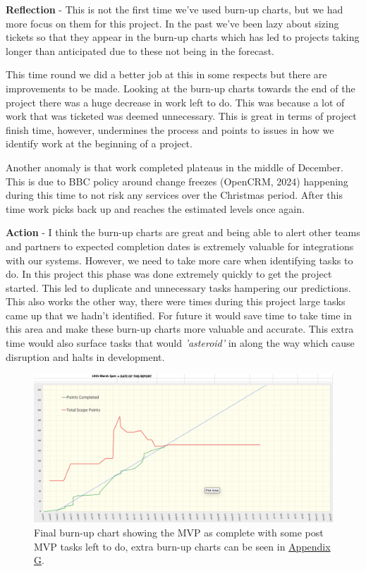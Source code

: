   \vspace{0.2cm}
  \textbf{Reflection} - This is not the first time we've used burn-up charts, but we had more focus on them for this project. In the past we've been 
  lazy about sizing tickets so that they appear in the burn-up charts which has led to projects taking longer than anticipated due to these not 
  being in the forecast.

  This time round we did a better job at this in some respects but there are improvements to be made. Looking at the burn-up charts towards the end of the 
  project there was a huge decrease in work left to do. This was because a lot of work that was ticketed was deemed unnecessary. This is great in terms of 
  project finish time, however, undermines the process and points to issues in how we identify work at the beginning of a project.

  Another anomaly is that work completed plateaus in the middle of December. This is due to BBC policy around change freezes (OpenCRM, 2024) happening 
  during this time to not risk any services over the Christmas period. After this time work picks back up and reaches the estimated levels once again.

  \vspace{0.2cm}
  \textbf{Action} - I think the burn-up charts are great and being able to alert other teams and partners to expected completion dates is extremely
  valuable for integrations with our systems. However, we need to take more care when identifying tasks to do. In this project this phase was done 
  extremely quickly to get the project started. This led to duplicate and unnecessary tasks hampering our predictions. This also works the other way, 
  there were times during this project large tasks came up that we hadn't identified. For future it would save time to take time in this area and make these 
  burn-up charts more valuable and accurate. This extra time would also surface tasks that would \textit{'asteroid'} in along the way which cause disruption 
  and halts in development.

  \begin{figure}[H]
    \centering
    \includegraphics[width=12cm]{assets/outputs/burnups/finalBurnUp.png}
    \caption{Final burn-up chart showing the MVP as complete with some post MVP tasks left to do, extra burn-up charts can be seen in 
    \hyperref[sec:sec:AppendixG]{Appendix G}.}
    \label{fig:finalBurnUp}
  \end{figure}

